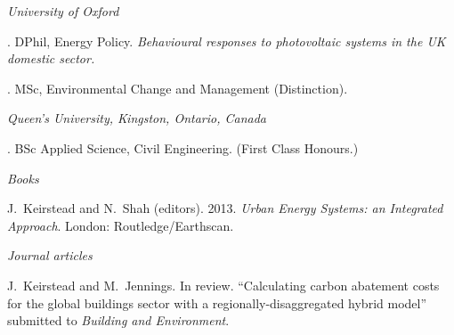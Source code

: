 \documentclass[11pt,a4paper]{article}
\begin{document}
\bigskip


\noindent{}%
%
\emph{University of Oxford \vspace{0.01in}}

.  DPhil, Energy Policy. \emph{Behavioural responses to photovoltaic systems in the UK domestic sector.}

.  MSc, Environmental Change and Management (Distinction).

\medskip

\noindent\emph{Queen's University, Kingston, Ontario, Canada\vspace{0.02in}}

. BSc Applied Science, Civil Engineering. (First Class Honours.) 

\bigskip
 
\noindent{}%
%
\noindent\emph{Books \vspace{0.01in}}

\ind J.\ Keirstead and N.\ Shah (editors).  2013. \emph{Urban Energy Systems: an Integrated Approach}. London: Routledge/Earthscan.

\bigskip

\emph{Journal articles \vspace{0.01in}} %
 
%

%
%
\ind J.\ Keirstead and M.\ Jennings. In review. ``Calculating carbon abatement costs for the global buildings sector with a regionally-disaggregated hybrid model'' submitted to \emph{Building and Environment}.  %
\end{document}
